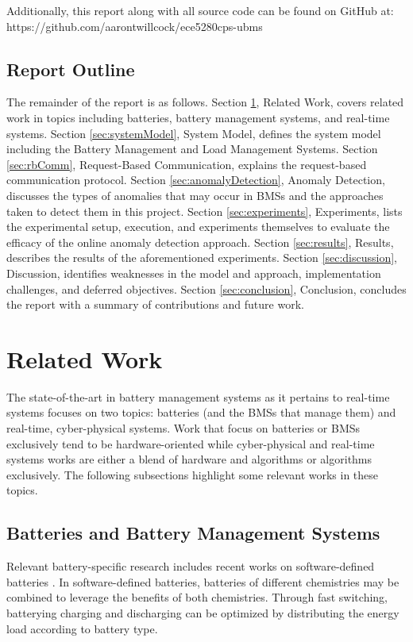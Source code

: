\documentclass[11pt,conference,draftcls,onecolumn]{IEEEtran}
\begin{document}
Additionally, this report along with all source code can be found on GitHub at:
https://github.com/aarontwillcock/ece5280cps-ubms

\subsection{Report Outline}
The remainder of the report is as follows.
Section \ref{sec:relatedWork}, Related Work, covers related work in topics including batteries, battery management systems, and real-time systems.
Section \ref{sec:systemModel}, System Model, defines the system model including the Battery Management and Load Management Systems.
Section \ref{sec:rbComm}, Request-Based Communication, explains the request-based communication protocol.
Section \ref{sec:anomalyDetection}, Anomaly Detection, discusses the types of anomalies that may occur in BMSs and the approaches taken to detect them in this project.
Section \ref{sec:experiments}, Experiments, lists the experimental setup, execution, and experiments themselves to evaluate the efficacy of the online anomaly detection approach.
Section \ref{sec:results}, Results, describes the results of the aforementioned experiments.
Section \ref{sec:discussion}, Discussion, identifies weaknesses in the model and approach, implementation challenges, and deferred objectives.
Section \ref{sec:conclusion}, Conclusion, concludes the report with a summary of contributions and future work. 

\section{Related Work}\label{sec:relatedWork}
The state-of-the-art in battery management systems as it pertains to real-time systems focuses on two topics: batteries (and the BMSs that manage them) and real-time, cyber-physical systems.
Work that focus on batteries or BMSs exclusively tend to be hardware-oriented while cyber-physical and real-time systems works are either a blend of hardware and algorithms or algorithms exclusively.
The following subsections highlight some relevant works in these topics.

\subsection{Batteries and Battery Management Systems}
Relevant battery-specific research includes recent works on software-defined batteries \cite{softwareDefinedBatteriesConf,softwareDefinedBatteriesJrnl}.
In software-defined batteries, batteries of different chemistries may be combined to leverage the benefits of both chemistries.
Through fast switching, batterying charging and discharging can be optimized by distributing the energy load according to battery type.
\end{document}

